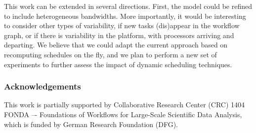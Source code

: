 \documentclass[conference]{IEEEtran}
\begin{document}
This work can be extended in several directions. First, the model could be refined to include
heterogeneous bandwidths. %
More importantly, it would be interesting to consider other types of variability, \egc
if new tasks (dis)appear in the workflow graph, or if there is variability in the platform, 
with processors arriving and departing. We believe that we could adapt the current approach
based on recomputing schedules on the fly, and we plan to perform a new set of experiments
to further assess the impact of dynamic scheduling techniques. 

\medskip

\subsubsection*{Acknowledgements}
This work is partially supported by Collaborative Research Center (CRC) 1404 FONDA
–- Foundations of Workflows for Large-Scale Scientific Data Analysis, which is funded
by German Research Foundation (DFG).


\balance
    
\end{document}
